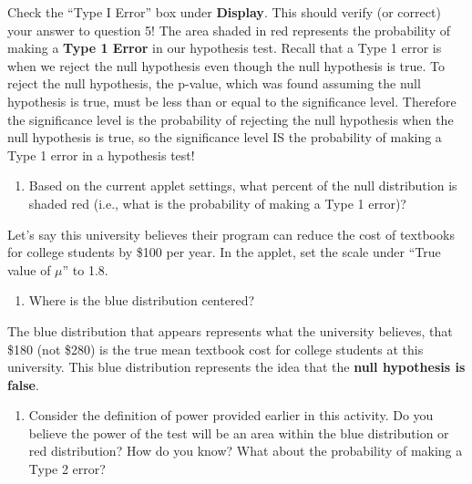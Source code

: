 \documentclass[
]{report}
\providecommand{\tightlist}{%
  \setlength{\itemsep}{0pt}\setlength{\parskip}{0pt}}
\begin{document}
Check the ``Type I Error'' box under \textbf{Display}. This should verify (or correct) your answer to question 5! The area shaded in red represents the probability of making a \textbf{Type 1 Error} in our hypothesis test. Recall that a Type 1 error is when we reject the null hypothesis even though the null hypothesis is true. To reject the null hypothesis, the p-value, which was found assuming the null hypothesis is true, must be less than or equal to the significance level. Therefore the significance level is the probability of rejecting the null hypothesis when the null hypothesis is true, so the significance level IS the probability of making a Type 1 error in a hypothesis test!

\begin{enumerate}
\def\labelenumi{\arabic{enumi}.}
\setcounter{enumi}{5}
\tightlist
\item
  Based on the current applet settings, what percent of the null distribution is shaded red (i.e., what is the probability of making a Type 1 error)?
  \vspace{0.25in}
\end{enumerate}

\newpage

Let's say this university believes their program can reduce the cost of textbooks for college students by \$100 per year. In the applet, set the scale under ``True value of \(\mu\)'' to 1.8.

\begin{enumerate}
\def\labelenumi{\arabic{enumi}.}
\setcounter{enumi}{6}
\tightlist
\item
  Where is the blue distribution centered?
  \vspace{0.25in}
\end{enumerate}

The blue distribution that appears represents what the university believes, that \$180 (not \$280) is the true mean textbook cost for college students at this university. This blue distribution represents the idea that the \textbf{null hypothesis is false}.

\begin{enumerate}
\def\labelenumi{\arabic{enumi}.}
\setcounter{enumi}{7}
\tightlist
\item
  Consider the definition of power provided earlier in this activity. Do you believe the power of the test will be an area within the blue distribution or red distribution? How do you know? What about the probability of making a Type 2 error?
  \vspace{1in}
\end{enumerate}
\end{document}

